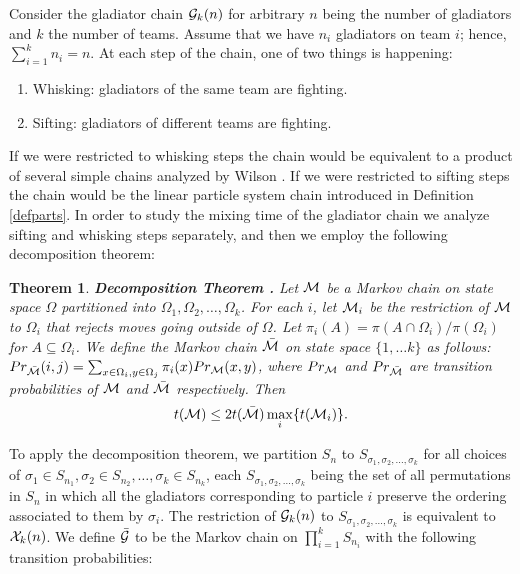 \documentclass[10 pt]{article}
\newcommand{\G}{{\cal G}}
\newcommand{\EX}{{\cal X}}
\newtheorem{thm}{Theorem}[section]
\begin{document}
Consider the gladiator chain ${\G_{k}(n)}$ for arbitrary $n$ being the number of gladiators  and $k$ the number of teams.
Assume that we have ${n}_i$ gladiators on team $i$; hence, $\sum_{i=1}^k{n}_i=n$.  At each step of the chain, one of two things is happening: 
\begin{enumerate}
\item Whisking: gladiators of the same team are fighting. 
\item Sifting:  gladiators of different teams are fighting.
\end{enumerate}
If we were restricted to  whisking steps the chain would be equivalent to a product of several simple chains analyzed by Wilson \cite{Wilson}.
If we were restricted to sifting steps the chain would be the linear particle system chain introduced in Definition \ref{defparts}. 
In order to study the mixing time of the gladiator chain we  analyze sifting and whisking steps separately, and then we employ the
following decomposition theorem: 

\begin{thm}\label{decom}  \textbf{Decomposition Theorem \cite{Decomposition}.}
Let $\cal M $ be a Markov chain on state space $\Omega$ partitioned into $\Omega_{1},\Omega_{2},\dots,\Omega_k$.
For each $i$, let ${\cal M}_i$ be the restriction of $\cal M$ to $\Omega_i$ that rejects  moves  going outside of $\Omega$.
Let $\pi_{i} (A)= \pi(A\cap \Omega_i)/\pi(\Omega_i)$ for $A\subseteq \Omega_i$. We define the Markov chain $\bar{\cal M}$ on
state space $\{1,\dots k\}$ as follows: $Pr_{\bar{\cal M}}(i,j)= \sum_{x\in \Omega_{i},y\in \Omega_j} \pi_i(x)Pr_{\cal M}(x,y)$,
where $Pr_{\cal M}$ and $Pr_{\bar{\cal M}}$ are transition probabilities of $\cal M$ and $\bar{\cal M}$ respectively. 
Then $$t({\cal M})\leq 2 t({\bar{\cal M}}) \max_i\{t({\cal M}_i)\}.$$

\end{thm}
 To apply the decomposition theorem, we partition $S_n$ to $S_{\sigma_1,\sigma_2, \dots, \sigma_k} $ for all choices of $ \sigma_1\in S_{n_1},
\sigma_2\in S_{n_2},\dots , \sigma_k\in S_{n_k}$, each $S_{\sigma_1,\sigma_2, \dots, \sigma_k}$ being the set of all permutations in
$S_n$ in which all the gladiators corresponding to particle $i$ preserve the ordering associated to them by $\sigma_i$.
The restriction of $\G_k(n)$ to $S_{\sigma_1,\sigma_2, \dots, \sigma_k}$ is equivalent to $\EX_{k}(n)$.
We define $\bar{\G}$ to be the Markov chain on $\prod_{i=1}^k S_{n_i}$ with the following transition probabilities: 
\end{document}
